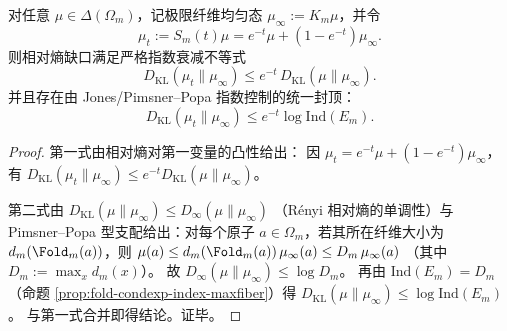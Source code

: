 \begin{proposition}\label{prop:xi-fiber-uniformization-kl-gap-exp-decay-index-cap}
对任意 \(\mu\in\Delta(\Omega_m)\)，记极限纤维均匀态 \(\mu_\infty:=K_m\mu\)，并令
\[
\mu_t:=S_m(t)\mu=e^{-t}\mu+(1-e^{-t})\mu_\infty.
\]
则相对熵缺口满足严格指数衰减不等式
\[
\boxed{\;
D_{\mathrm{KL}}(\mu_t\|\mu_\infty)\le e^{-t}\,D_{\mathrm{KL}}(\mu\|\mu_\infty).\;}
\]
并且存在由 Jones/Pimsner--Popa 指数控制的统一封顶：
\[
\boxed{\;
D_{\mathrm{KL}}(\mu_t\|\mu_\infty)\le e^{-t}\log\mathrm{Ind}(E_m).\;}
\]
\end{proposition}
\begin{proof}
第一式由相对熵对第一变量的凸性给出：
因 \(\mu_t=e^{-t}\mu+(1-e^{-t})\mu_\infty\)，有
\(
D_{\mathrm{KL}}(\mu_t\|\mu_\infty)\le e^{-t}D_{\mathrm{KL}}(\mu\|\mu_\infty)
\)。
\par
第二式由
\(
D_{\mathrm{KL}}(\mu\|\mu_\infty)\le D_\infty(\mu\|\mu_\infty)
\)
（Rényi 相对熵的单调性）与 Pimsner--Popa 型支配给出：对每个原子 \(a\in\Omega_m\)，若其所在纤维大小为 \(d_m(\Fold_m(a))\)，则
\(
\mu(a)\le d_m(\Fold_m(a))\,\mu_\infty(a)\le D_m\,\mu_\infty(a)
\)
（其中 \(D_m:=\max_x d_m(x)\)）。
故 \(D_\infty(\mu\|\mu_\infty)\le \log D_m\)。
再由 \(\mathrm{Ind}(E_m)=D_m\)（命题 \ref{prop:fold-condexp-index-maxfiber}）得
\(
D_{\mathrm{KL}}(\mu\|\mu_\infty)\le \log\mathrm{Ind}(E_m)
\)。
与第一式合并即得结论。证毕。
\end{proof}

